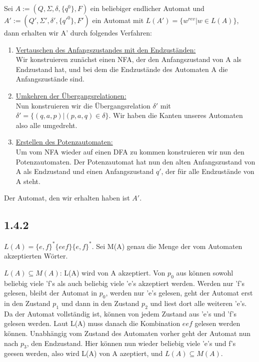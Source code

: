 \documentclass{article}
\begin{document}
Sei $A := (Q, \Sigma, \delta, \{q^0\}, F)$ ein beliebiger endlicher Automat und
$A' := (Q', \Sigma', \delta', \{{q'}^0\}, F')$ ein Automat mit $L(A') = \{
    w^{rev} | w \in L(A)\}$, dann erhalten wir A' durch folgendes Verfahren: \\
\begin{enumerate}
\item \underline{Vertauschen des Anfangszustandes mit den Endzuständen:} \\
    Wir konstruieren zunächst einen NFA, der den Anfangszustand von A als
    Endzustand hat, und bei dem die Endzustände des Automaten A die
    Anfangszustände sind.
\item \underline{Umkehren der Übergangsrelationen:} \\
    Nun konstruieren wir die Übergangsrelation $\delta'$ mit $\delta' = \{(q,a,p)
    | (p,a,q) \in \delta \}$. Wir haben die Kanten unseres Automaten also alle
    umgedreht.
\item \underline{Erstellen des Potenzautomaten:} \\
    Um vom NFA wieder auf einen DFA zu kommen konstruieren wir nun den
    Potenzautomaten. Der Potenzautomat hat nun den alten Anfangszustand von A
    als Endzustand und einen Anfangszustand $q'$, der für alle Endzustände von A
    steht.
\end{enumerate}

Der Automat, den wir erhalten haben ist $A'$.

\subsection*{1.4.2}
$L(A) =\{e,f\}^*\{eef\}\{e,f\}^*$. Sei M(A) genau die Menge der vom Automaten
akzeptierten Wörter. 

$L(A) \subseteq M(A)$: L(A) wird von A akzeptiert. Von $ p_0$ aus können sowohl
beliebig viele 'f's als auch beliebig viele 'e's akzeptiert werden.  Werden nur
'f's gelesen, bleibt der Automat in $p_0$, werden nur 'e's gelesen, geht der
Automat erst in den Zustand $p_1$ und dann in den Zustand $p_2$ und liest dort
alle weiteren 'e's. Da der Automat vollständig ist, können von jedem Zustand aus
'e's und 'f's gelesen werden. Laut L(A) muss danach die Kombination {$eef$}
gelesen werden können. Unabhängig vom Zustand des Automaten vorher geht der
Automat nun nach $p_3$, den Endzustand. Hier können nun wieder beliebig viele
'e's und f's geesen werden, also wird L(A) von A azeptiert, und $L(A) \subseteq
M(A)$.   
\end{document}

